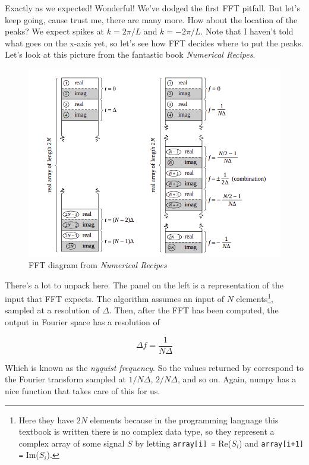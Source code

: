 \documentclass[a4paper]{article}
\begin{document}
Exactly as we expected! Wonderful! We've dodged the first FFT pitfall. But let's keep going, cause trust me, there are many more. How about the location of the peaks? We expect spikes at $k = 2\pi /L$ and $k = -2\pi / L$. Note that I haven't told  what goes on the x-axis yet, so let's see how FFT decides where to put the peaks. Let's look at this picture from the fantastic book \textit{Numerical Recipes}.

\begin{figure}[H]
    \centering
    \includegraphics[width = 0.8\linewidth]{figures/fft.png}
    \caption{FFT diagram from \textit{Numerical Recipes}}
    \label{fig:fft}
\end{figure}

There's a lot to unpack here. The panel on the left is a representation of the input that FFT expects. The algorithm assumes an input of $N$ elements\footnote{Here they have $2N$ elements because in the programming language this textbook is written there is no complex data type, so they represent a complex array of some signal $S$ by letting \lstinline{array[i] =} Re($S_i$) and \lstinline{array[i+1] =} Im($S_i$).}, sampled at a resolution of $\Delta$. Then, after the FFT has been computed, the output in Fourier space has a resolution of 

\begin{equation*}
    \Delta f = \frac{1}{N\Delta}
\end{equation*}

Which is known as the \textit{nyquist frequency}. So the values returned by  correspond to the Fourier transform sampled at $1/ N \Delta$, $2/ N\Delta$, and so on. Again, numpy has a nice function that takes care of this for us. 
\end{document}
